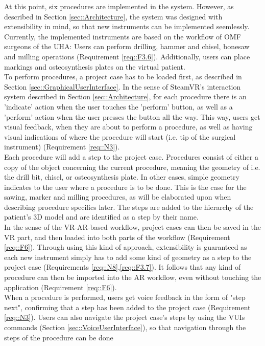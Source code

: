 At this point, six procedures are implemented in the system.
However, as described in Section \ref{sec::Architecture}, the system was designed with extensibility in mind, so that new instruments can be implemented seemlessly.
Currently, the implemented instruments are based on the workflow of OMF surgeons of the UHA: Users can perform drilling, hammer and chisel, bonesaw and milling operations (Requirement \ref{req::F3.6}).
Additionally, users can place markings and osteosynthesis plates on the virtual patient.
\\ To perform procedures, a project case has to be loaded first, as described in Section \ref{sec::GraphicalUserInterface}.
In the sense of SteamVR's interaction system described in Section \ref{sec::Architecture}, for each procedure there is an 'indicate' action when the user touches the 
'perform' button, as well as a 'perform' action when the user presses the button all the way.
This way, users get visual feedback, when they are about to perform a procedure, as well as having visual indications of where the procedure will start (i.e. tip of the surgical instrument) (Requirement \ref{req::N3}).
\\ Each procedure will add a step to the project case.
Procedures consist of either a copy of the object concerning the current procedure, meaning the geometry of i.e. the drill bit, chisel, or osteosynthesis plate.
In other cases, simple geometry indicates to the user where a procedure is to be done. This is the case for the sawing, marker and milling procedures, as will be elaborated upon 
when describing procedure specifics later.
The steps are added to the hierarchy of the patient's 3D model and are identified as a step by their name.
\\ In the sense of the VR-AR-based workflow, project cases can then be saved in the VR part, and then loaded into both parts of the workflow (Requirement \ref{req::F6}).
Through using this kind of approach, extensibility is guaranteed as each new instrument simply has to add some kind of geometry as a step to the project case (Requirements \ref{req::N8},\ref{req::F3.7}).
It follows that any kind of procedure can then be imported into the AR workflow, even without touching the application (Requirement \ref{req::F6}).
\\ When a procedure is performed, users get voice feedback in the form of "step next", confirming that a step has been added to the project case (Requirement \ref{req::N3}).
Users can also navigate the project case's steps by using the VUIs commands (Section \ref{sec::VoiceUserInterface}), so that navigation through the steps of the procedure can be done 
